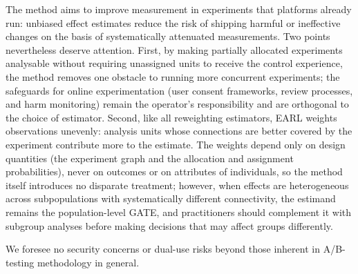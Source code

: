 \documentclass[sigconf,anonymous,review]{acmart}
\begin{document}
The method aims to improve measurement in experiments that platforms already run: unbiased effect estimates reduce the risk of shipping harmful or ineffective changes on the basis of systematically attenuated measurements. Two points nevertheless deserve attention. First, by making partially allocated experiments analysable without requiring unassigned units to receive the control experience, the method removes one obstacle to running more concurrent experiments; the safeguards for online experimentation (user consent frameworks, review processes, and harm monitoring) remain the operator's responsibility and are orthogonal to the choice of estimator. Second, like all reweighting estimators, EARL weights observations unevenly: analysis units whose connections are better covered by the experiment contribute more to the estimate. The weights depend only on design quantities (the experiment graph and the allocation and assignment probabilities), never on outcomes or on attributes of individuals, so the method itself introduces no disparate treatment; however, when effects are heterogeneous across subpopulations with systematically different connectivity, the estimand remains the population-level GATE, and practitioners should complement it with subgroup analyses before making decisions that may affect groups differently.

We foresee no security concerns or dual-use risks beyond those inherent in A/B-testing methodology in general.



\end{document}
